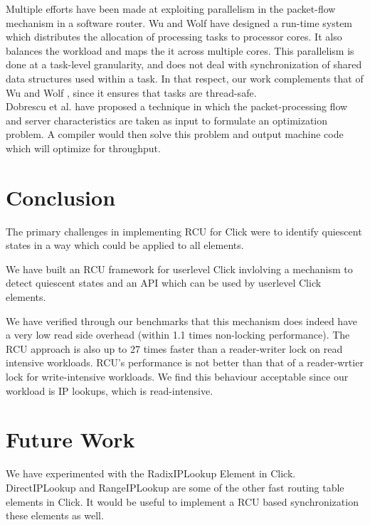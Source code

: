 \documentclass[a4paper]{article}
\begin{document}
Multiple efforts have been made at exploiting parallelism in the packet-flow mechanism in a software router. Wu and Wolf \cite{runtimepacketprocessing} have designed a run-time system which distributes the allocation of processing tasks to processor cores. It also balances the workload and maps the it across multiple cores. This parallelism is done at a task-level granularity, and does not deal with synchronization of shared data structures used within a task. In that respect, our work complements that of Wu and Wolf \cite{runtimepacketprocessing}, since it ensures that tasks are thread-safe.\\ 


Dobrescu et al. \cite{dobrescu} have proposed a technique in which the packet-processing flow and server characteristics are taken as input to formulate an optimization problem. A compiler would then solve this problem and output machine code which will optimize for throughput.

\section{Conclusion}

The primary challenges in implementing RCU for Click were to
identify quiescent states in a way which could be applied to all
elements. 

We have built an RCU framework for userlevel Click invlolving a
mechanism to detect quiescent states and an API which can be used by userlevel Click elements.

We have verified through our benchmarks that this mechanism does
indeed have a very low read side overhead (within 1.1 times
non-locking performance). The RCU approach is also up to 27 times
faster than a reader-writer lock on read intensive workloads. RCU's performance is not better than that of a reader-wrtier lock for
write-intensive workloads. We find this behaviour acceptable since our
workload is IP lookups, which is read-intensive. 
\section{Future Work}

We have experimented with the RadixIPLookup Element in Click. DirectIPLookup and RangeIPLookup are some of the other fast routing table elements in Click. It would be useful to implement a RCU based synchronization these elements as well.\\ 
\end{document}
